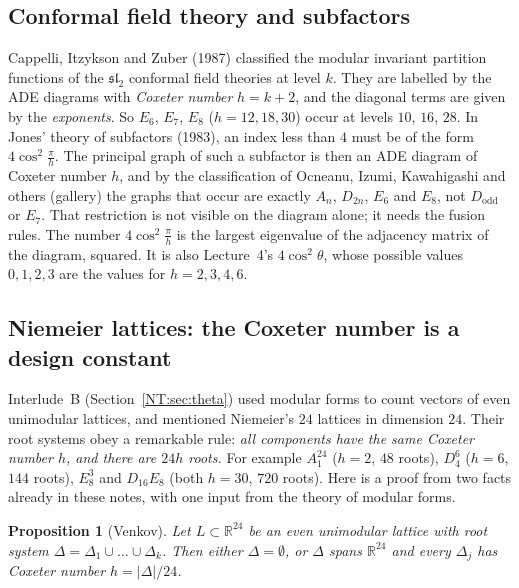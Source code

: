 \documentclass[11pt,openany]{book}
\theoremstyle{plain}
\newtheorem{proposition}[theorem]{Proposition}
\theoremstyle{definition}
\theoremstyle{remark}
\newcommand{\R}{\mathbb{R}}
\newcommand{\abs}[1]{\left\lvert #1 \right\rvert}
\begin{document}
\subsection*{Conformal field theory and subfactors}
Cappelli, Itzykson and Zuber (1987) classified the modular invariant partition functions of the
$\mathfrak{sl}_2$ conformal field theories at level $k$. They are labelled by the ADE diagrams with
\emph{Coxeter number} $h=k+2$, and the diagonal terms are given by the \emph{exponents}. So $E_6$, $E_7$,
$E_8$ ($h=12,18,30$) occur at levels $10$, $16$, $28$. In Jones' theory of subfactors (1983), an index less than $4$ must be
of the form $4\cos^2\frac\pi h$. The principal graph of such a subfactor is then an ADE diagram of
Coxeter number $h$, and by the classification of Ocneanu, Izumi, Kawahigashi and others (gallery) the
graphs that occur are exactly $A_n$, $D_{2n}$, $E_6$ and $E_8$, not $D_{\mathrm{odd}}$ or $E_7$. That
restriction is not visible on the diagram alone; it needs the fusion rules. The number $4\cos^2\frac\pi h$ is the largest eigenvalue of the
adjacency matrix of the diagram, squared. It is also Lecture~4's $4\cos^2\theta$, whose possible values
$0,1,2,3$ are the values for $h=2,3,4,6$.

\subsection*{Niemeier lattices: the Coxeter number is a design constant}
Interlude~B (Section~\ref{NT:sec:theta}) used modular forms to count vectors of even unimodular lattices,
and mentioned Niemeier's $24$ lattices in dimension $24$. Their root systems obey a remarkable rule:
\emph{all components have the same Coxeter number $h$, and there are $24h$ roots.} For example
$A_1^{24}$ ($h=2$, $48$ roots), $D_4^6$ ($h=6$, $144$ roots), $E_8^3$ and $D_{16}E_8$ (both $h=30$, $720$ roots).
Here is a proof from two facts already in these notes, with one input from the theory of modular forms.

\begin{proposition}[Venkov]\label{DYN:prop:venkov}
Let $L\subset\R^{24}$ be an even unimodular lattice with root system $\Delta=\Delta_1\cup\dots\cup\Delta_k$.
Then either $\Delta=\emptyset$, or $\Delta$ spans $\R^{24}$ and every $\Delta_j$ has Coxeter number
$h=\abs\Delta/24$.
\end{proposition}
\end{document}
